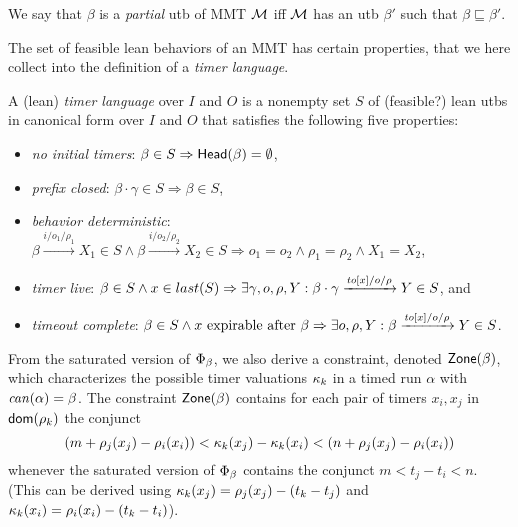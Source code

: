 We say that $\beta$ is a \emph{partial} utb of MMT ${\mathcal M}$ iff ${\mathcal M}$ has an utb $\beta'$ such that $\beta \sqsubseteq \beta'$.


The set of feasible lean behaviors of an MMT has certain properties, that
we here collect into the definition of a \emph{timer language}.

\begin{definition}
\label{def:timer language}
A (lean) \emph{timer language} over $I$ and $O$ is a nonempty set 
$S$ of (feasible?) lean utbs in canonical form over $I$ and $O$ that satisfies the following five properties:
\begin{itemize}
\item
\emph{no initial timers}: $\beta \in S \Rightarrow \mathsf{Head}({\beta}) = \emptyset$,
\item
\emph{prefix closed}: $\beta \cdot \gamma \in S \Rightarrow \beta \in S$,
\item
\emph{behavior deterministic}:
$\beta \xrightarrow{i/o_1/\rho_1} X_1 \in S \wedge \beta \xrightarrow{i/o_2/\rho_2} X_2 \in S \Rightarrow o_1 = o_2 \wedge \rho_1 = \rho_2 \wedge X_1 = X_2$,
\item
\emph{timer live}:
$\beta \in S \wedge x \in last(S) \Rightarrow \exists \gamma, o, \rho, Y : \beta \cdot \gamma \xrightarrow{\mathit{to}[x]/o/\rho} Y \in S$,
and
\item
\emph{timeout complete}:
$\beta \in S \wedge x \mbox{ expirable after } \beta \Rightarrow
\exists o, \rho, Y: \beta \xrightarrow{\mathit{to}[x]/o/\rho} Y \in S$.
\end{itemize}
\end{definition}

From the saturated version of $\Phi_{\beta}$, we also derive a constraint,
denoted $\mathsf{Zone}({\beta})$,
which characterizes the possible timer valuations $\kappa_k$ in a timed run
$\alpha$ with $\mathit{can}({\alpha}) = \beta$.
The constraint $\mathsf{Zone}({\beta})$
contains for each pair of timers $x_i,x_j$ in ${\textsf{dom}}(\rho_k)$ the conjunct
\[
(m + \rho_j(x_j) - \rho_i(x_i)) < \kappa_k(x_j) -\kappa_k(x_i) < (n + \rho_j(x_j) - \rho_i(x_i))
\]
whenever the saturated version of $\Phi_{\beta}$ contains the conjunct
\(
m < t_j - t_i < n
\).
(This can be derived using
$\kappa_k(x_j) = \rho_j(x_j) - (t_k - t_j)$
and
$\kappa_k(x_i) = \rho_i(x_i) - (t_k - t_i)$).

